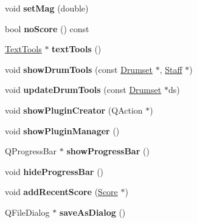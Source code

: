 \begin{DoxyCompactItemize}
void {\bfseries set\+Mag} (double)
\item 
\mbox{\label{class_ms_1_1_muse_score_a9b75b87ca1b923d53d0f60a3208406d7}} 
bool {\bfseries no\+Score} () const
\item 
\mbox{\label{class_ms_1_1_muse_score_a2e7cecaa4c33b794f50748e584ef64cc}} 
\hyperlink{class_ms_1_1_text_tools}{Text\+Tools} $\ast$ {\bfseries text\+Tools} ()
\item 
\mbox{\label{class_ms_1_1_muse_score_a4ae33ee1dcdb761b3efb1e500264b600}} 
void {\bfseries show\+Drum\+Tools} (const \hyperlink{class_ms_1_1_drumset}{Drumset} $\ast$, \hyperlink{class_ms_1_1_staff}{Staff} $\ast$)
\item 
\mbox{\label{class_ms_1_1_muse_score_a6df8a161cc2b69fbd77b5cdc9da09ab5}} 
void {\bfseries update\+Drum\+Tools} (const \hyperlink{class_ms_1_1_drumset}{Drumset} $\ast$ds)
\item 
\mbox{\label{class_ms_1_1_muse_score_aaa31083a3745ccdb303d51cc8d782b12}} 
void {\bfseries show\+Plugin\+Creator} (Q\+Action $\ast$)
\item 
\mbox{\label{class_ms_1_1_muse_score_a4a73448e5a87133b3c94483da129263b}} 
void {\bfseries show\+Plugin\+Manager} ()
\item 
\mbox{\label{class_ms_1_1_muse_score_a72b9b720b277ee41b8f98dbafd117cc1}} 
Q\+Progress\+Bar $\ast$ {\bfseries show\+Progress\+Bar} ()
\item 
\mbox{\label{class_ms_1_1_muse_score_a63de0ecb60b0774ff23e88b32a7b04f7}} 
void {\bfseries hide\+Progress\+Bar} ()
\item 
\mbox{\label{class_ms_1_1_muse_score_ac8cd275b89480fdb48e63fbb2b001d66}} 
void {\bfseries add\+Recent\+Score} (\hyperlink{class_ms_1_1_score}{Score} $\ast$)
\item 
\mbox{\label{class_ms_1_1_muse_score_a43c900da99982d0f368ded241852b2a3}} 
Q\+File\+Dialog $\ast$ {\bfseries save\+As\+Dialog} ()

\end{DoxyCompactItemize}
